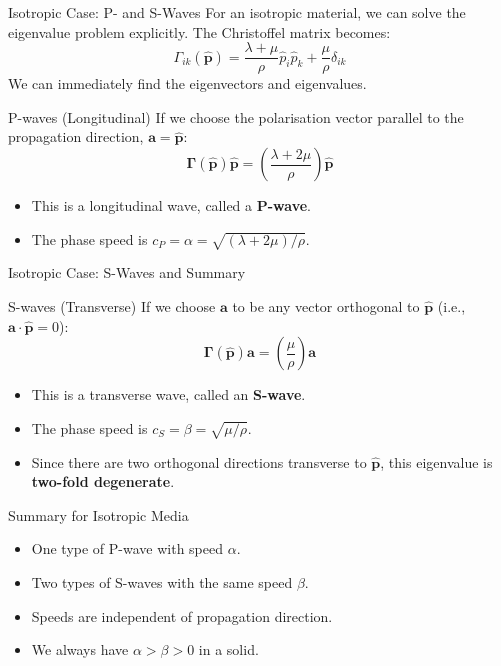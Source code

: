 \documentclass{beamer}
\begin{document}

\begin{frame}{Isotropic Case: P- and S-Waves}
    For an isotropic material, we can solve the eigenvalue problem explicitly. The Christoffel matrix becomes:
    $$ \Gamma_{ik}(\hat{\mathbf{p}})=\frac{\lambda+\mu}{\rho}\hat{p}_{i}\hat{p}_{k}+\frac{\mu}{\rho}\delta_{ik} $$
    \pause
    We can immediately find the eigenvectors and eigenvalues.
    \begin{block}{P-waves (Longitudinal)}
        If we choose the polarisation vector parallel to the propagation direction, $\mathbf{a} = \hat{\mathbf{p}}$:
        $$ \mathbf{\Gamma}(\hat{\mathbf{p}})\hat{\mathbf{p}} = \left(\frac{\lambda+2\mu}{\rho}\right) \hat{\mathbf{p}} $$
        \begin{itemize}
            \item This is a longitudinal wave, called a \textbf{P-wave}.
            \item The phase speed is $c_P = \alpha = \sqrt{(\lambda+2\mu)/\rho}$.
        \end{itemize}
    \end{block}
\end{frame}

\begin{frame}{Isotropic Case: S-Waves and Summary}
    \begin{block}{S-waves (Transverse)}
        If we choose $\mathbf{a}$ to be any vector orthogonal to $\hat{\mathbf{p}}$ (i.e., $\mathbf{a} \cdot \hat{\mathbf{p}}=0$):
        $$ \mathbf{\Gamma}(\hat{\mathbf{p}})\mathbf{a} = \left(\frac{\mu}{\rho}\right) \mathbf{a} $$
        \begin{itemize}
            \item This is a transverse wave, called an \textbf{S-wave}.
            \item The phase speed is $c_S = \beta = \sqrt{\mu/\rho}$.
            \item Since there are two orthogonal directions transverse to $\hat{\mathbf{p}}$, this eigenvalue is \textbf{two-fold degenerate}.
        \end{itemize}
    \end{block}
    \pause
    \begin{alertblock}{Summary for Isotropic Media}
        \begin{itemize}
            \item One type of P-wave with speed $\alpha$.
            \item Two types of S-waves with the same speed $\beta$.
            \item Speeds are independent of propagation direction.
            \item We always have $\alpha > \beta > 0$ in a solid.
        \end{itemize}
    \end{alertblock}
\end{frame}
\end{document}
